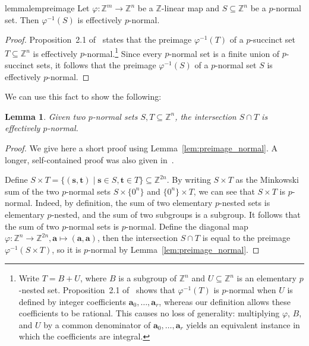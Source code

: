 \documentclass[letterpaper, 11pt, thm-restate]{article}
\numberwithin{equation}{section}
\newcommand{\Z}{\mathbb{Z}}
\newcommand{\ba}{\boldsymbol{a}}
\newcommand{\bs}{\boldsymbol{s}}
\newcommand{\bt}{\boldsymbol{t}}
\newtheorem{lemma}[theorem]{Lemma}
\theoremstyle{definition}
\theoremstyle{definition}
\theoremstyle{definition}
\begin{document}

\begin{restatable}{lemma}{lempreimage}\label{lem:preimage_normal}
    Let $\varphi \colon \Z^m \rightarrow \Z^n$ be a $\Z$-linear map and $S \subseteq \Z^n$ be a $p$-normal set. Then $\varphi^{-1}(S)$ is effectively $p$-normal.
\end{restatable}
\begin{proof}
    Proposition~2.1 of~\cite{derksen2015linear} states that the preimage $\varphi^{-1}(T)$ of a $p$-succinct set $T \subseteq \Z^n$ is effectively $p$-normal.\footnote{Write $T=B+U$, where $B$ is a subgroup of $\Z^n$ and $U\subseteq\Z^n$ is an elementary $p$-nested set. Proposition~2.1 of~\cite{derksen2015linear} shows that $\varphi^{-1}(T)$ is $p$-normal when $U$ is defined by integer coefficients $\ba_0,\ldots,\ba_r$, whereas our definition allows these coefficients to be rational. This causes no loss of generality: multiplying $\varphi$, $B$, and $U$ by a common denominator of $\ba_0,\ldots,\ba_r$ yields an equivalent instance in which the coefficients are integral.}
    Since every $p$-normal set is a finite union of $p$-succinct sets, it follows that the preimage $\varphi^{-1}(S)$ of a $p$-normal set $S$ is effectively $p$-normal.
\end{proof}

We can use this fact to show the following:

\begin{lemma}\label{lem:inter_normal}
    Given two $p$-normal sets $S, T \subseteq \Z^n$, the intersection $S \cap T$ is effectively $p$-normal.
\end{lemma}
\begin{proof} 
    We give here a short proof using Lemma~\ref{lem:preimage_normal}.
    A longer, self-contained proof was also given in~\cite[Proposition~3.7]{dong2025s}.
    
    Define $S \times T = \{(\bs, \bt) \mid \bs \in S, \bt \in T\} \subseteq \Z^{2n}$.
    By writing $S \times T$ as the Minkowski sum of the two $p$-normal sets $S \times \{0^n\}$ and $\{0^n\} \times T$, we can see that $S \times T$ is $p$-normal.
    Indeed, by definition, the sum of two elementary $p$-nested sets is elementary $p$-nested, and the sum of two subgroups is a subgroup.
    It follows that the sum of two $p$-normal sets is $p$-normal.
    Define the diagonal map $\varphi \colon \Z^n \rightarrow \Z^{2n}, \ba \mapsto (\ba, \ba)$, then the intersection $S \cap T$ is equal to the preimage $\varphi^{-1}(S \times T)$, so it is $p$-normal by Lemma~\ref{lem:preimage_normal}.
\end{proof}
\end{document}
